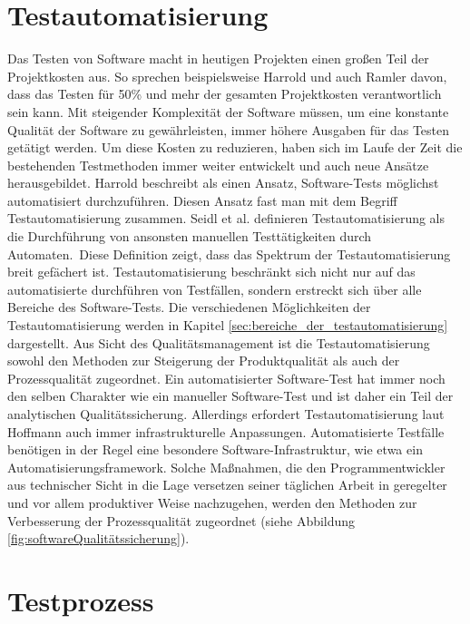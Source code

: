 \section{Testautomatisierung}
\label{sec:testautoGrundlagen}
Das Testen von Software macht in heutigen Projekten einen großen Teil der Projektkosten aus. So sprechen beispielsweise Harrold \cite{harrold_testing:_2000} und auch Ramler \cite{ramler_economic_2006} davon, dass das Testen für 50\% 
und mehr der gesamten Projektkosten verantwortlich sein kann. 
Mit steigender Komplexität der Software müssen, um eine konstante Qualität der Software zu gewährleisten, immer höhere Ausgaben für das Testen getätigt werden.  
Um diese Kosten zu reduzieren, haben sich im Laufe der Zeit die bestehenden Testmethoden immer weiter entwickelt und auch neue Ansätze herausgebildet. Harrold \cite{harrold_testing:_2000} beschreibt als einen Ansatz, Software-Tests möglichst automatisiert durchzuführen. Diesen Ansatz fast man mit dem Begriff Testautomatisierung zusammen.
Seidl et al. \cite[S.7]{seidl_basiswissen_2012} definieren Testautomatisierung als \glqq die Durchführung von ansonsten manuellen Testtätigkeiten durch Automaten.\grqq\
Diese Definition zeigt, dass das Spektrum der Testautomatisierung breit gefächert ist. Testautomatisierung beschränkt sich nicht nur auf das automatisierte durchführen von Testfällen, sondern erstreckt sich über alle Bereiche des Software-Tests. Die verschiedenen Möglichkeiten der Testautomatisierung werden in Kapitel \ref{sec:bereiche_der_testautomatisierung} dargestellt.
Aus Sicht des Qualitätsmanagement ist die Testautomatisierung sowohl den Methoden zur Steigerung der Produktqualität als auch der Prozessqualität zugeordnet. Ein automatisierter Software-Test hat immer noch den selben Charakter wie ein manueller Software-Test und ist daher ein Teil der analytischen Qualitätssicherung. Allerdings erfordert Testautomatisierung laut Hoffmann \cite[vgl. Seite 25]{hoffmann_software-qualitat_2013} auch immer infrastrukturelle Anpassungen. Automatisierte Testfälle benötigen in der Regel eine besondere Software-Infrastruktur, wie etwa ein Automatisierungsframework. Solche Maßnahmen, die den Programmentwickler aus technischer Sicht in die Lage versetzen seiner täglichen Arbeit in geregelter und vor allem produktiver Weise nachzugehen, werden den Methoden zur Verbesserung der Prozessqualität zugeordnet (siehe Abbildung \ref{fig:softwareQualitätssicherung}).



\section{Testprozess}
\label{sec:testprozess}

